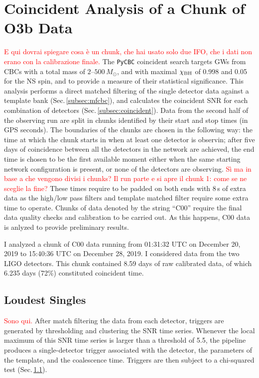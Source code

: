 \documentclass[binding=0.6cm, LaM]{sapthesis}
\newcommand{\fpg}[1]{\textcolor{red}{#1} }
\begin{document}
\section{Coincident Analysis of a Chunk of O3b Data}
\label{sec:pycbc00}
\fpg{E qui dovrai spiegare cosa \`e un chunk, che hai usato solo due IFO, che i dati non erano con la calibrazione finale.}
	The {\texttt{PyCBC}} coincident search targets GWs from CBCs with a total mass of $2$--$500\,M_\odot$,
        and with maximal $\chi_{\rm BH}$ of 0.998 and 0.05 for the NS spin,
        and to provide a measure of their statistical significance.
        This analysis performs a direct matched filtering of the single detector data against a template bank (Sec.\,\ref{subsec:mfcbc}),
        and calculates the coincident SNR for each combination of detectors (Sec.\,\ref{subsec:coincident}).
	Data from the second half of the observing run are split in chunks
	identified by their start and stop times (in GPS seconds).
	The boundaries of the chunks are chosen in the following way:
	the time at which the chunk starts in when at least one detector is observin;
	after five days of coincidence between all the detectors in the network are achieved,
	the end time is chosen to be the first available moment either when the same starting network configuration is present,
	or none of the detectors are observing. \fpg{S\`i ma in base a che vengono divisi i chunks?  Il run parte e si apre il chunk 1: come se ne sceglie la fine?}
	These times require to be padded on both ends with 8\,s of extra data 	
	as the high/low pass filters and template matched filter require some extra time to operate.
	Chunks of data denoted by the string ``C00'' require the final data quality checks and calibration to be carried out.
        As this happens, C00 data is anlyzed to provide preliminary results.

        I analyzed a chunk of C00 data running from 01:31:32 UTC on December 20, 2019 to 15:40:36 UTC on December 28, 2019.  I considered data from the two LIGO detectors.  This chunk contained 8.59 days of raw calibrated data,
        of which 6.235 days (72\%) constituted coincident time.

\subsection{Loudest Singles}
\fpg{Sono qui.}
	After match filtering the data from each detector,
	triggers are generated by thresholding and clustering the SNR time series. 
        Whenever the local maximum of this SNR time series is larger than a threshold of 5.5,
        the pipeline produces a single-detector trigger associated with the detector,
        the parameters of the template, and the coalescence time.
	Triggers are then subject to a chi-squared test (Sec.\,\ref{}).
\end{document}
